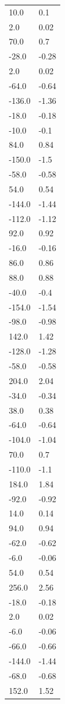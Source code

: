 \begin{longtable}{ll}
10.0 & 0.1 \\
2.0 & 0.02 \\
70.0 & 0.7 \\
-28.0 & -0.28 \\
2.0 & 0.02 \\
-64.0 & -0.64 \\
-136.0 & -1.36 \\
-18.0 & -0.18 \\
-10.0 & -0.1 \\
84.0 & 0.84 \\
-150.0 & -1.5 \\
-58.0 & -0.58 \\
54.0 & 0.54 \\
-144.0 & -1.44 \\
-112.0 & -1.12 \\
92.0 & 0.92 \\
-16.0 & -0.16 \\
86.0 & 0.86 \\
88.0 & 0.88 \\
-40.0 & -0.4 \\
-154.0 & -1.54 \\
-98.0 & -0.98 \\
142.0 & 1.42 \\
-128.0 & -1.28 \\
-58.0 & -0.58 \\
204.0 & 2.04 \\
-34.0 & -0.34 \\
38.0 & 0.38 \\
-64.0 & -0.64 \\
-104.0 & -1.04 \\
70.0 & 0.7 \\
-110.0 & -1.1 \\
184.0 & 1.84 \\
-92.0 & -0.92 \\
14.0 & 0.14 \\
94.0 & 0.94 \\
-62.0 & -0.62 \\
-6.0 & -0.06 \\
54.0 & 0.54 \\
256.0 & 2.56 \\
-18.0 & -0.18 \\
2.0 & 0.02 \\
-6.0 & -0.06 \\
-66.0 & -0.66 \\
-144.0 & -1.44 \\
-68.0 & -0.68 \\
152.0 & 1.52 \\

\end{longtable}
